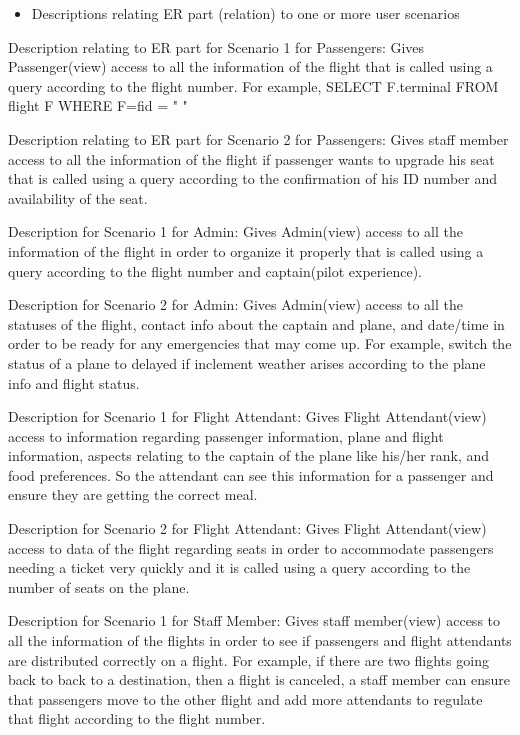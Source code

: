 \documentclass[10pt,conference]{IEEEtran}
\begin{document}
\vspace{5mm}

\begin{itemize} \item{Descriptions relating ER part (relation) to one or more user scenarios} \end{itemize}

\textnormal{Description relating to ER part for Scenario 1 for Passengers: Gives Passenger(view) access to all the information of the flight that is called using a query according to the flight number.      For example,  SELECT F.terminal  FROM  flight F   WHERE F=fid = " "}


\textnormal{Description relating to ER part for Scenario 2 for Passengers: Gives staff member access to all the information of the flight if passenger wants to upgrade his seat that is called using a query according to the confirmation of his ID number and availability of the seat.}


\textnormal{Description for Scenario 1 for Admin: Gives Admin(view) access to all the information of the flight in order to organize it properly that is called using a query according to the flight number and captain(pilot experience).}


\textnormal{Description for Scenario 2 for Admin: Gives Admin(view) access to all the statuses of the flight, contact info about the captain and plane, and date/time in order to be ready for any emergencies that may come up. For example, switch the status of a plane to delayed if inclement weather arises according to the plane info and flight status.}


\textnormal{Description for Scenario 1 for Flight Attendant: Gives Flight Attendant(view) access to information regarding passenger information,
plane and flight information, aspects relating to the captain of the plane like his/her rank, and food preferences. So the attendant can see this information for a passenger and ensure they are getting the correct meal.}


\textnormal{Description for Scenario 2 for Flight Attendant: Gives Flight Attendant(view) access to data of the flight regarding seats in order to accommodate passengers needing a ticket very quickly and it is called using a query according to the number of seats on the plane.}


\textnormal{Description for Scenario 1 for Staff Member: Gives staff member(view) access to all the information of the flights in order to see if passengers and flight attendants are distributed correctly on a flight. For example, if there are two flights going back to back to a destination, then a flight is canceled, a staff member can ensure that passengers move to the other flight and add more attendants to regulate that flight according to the flight number. }
\end{document}
